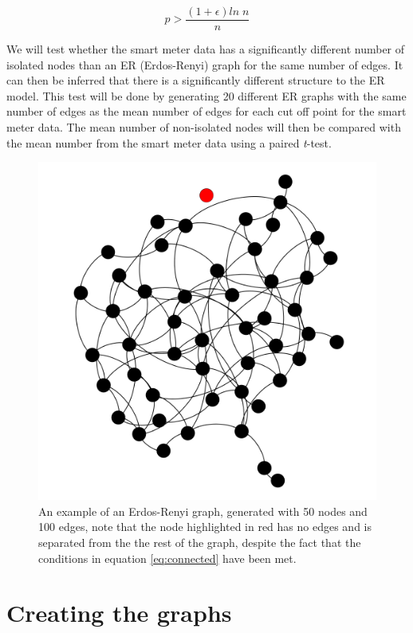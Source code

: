 \begin{equation}
\label{eq:connected}
    p>\frac{(1+\epsilon)ln \; n }{n}
\end{equation}

We will test whether the smart meter data has a significantly different number of isolated nodes than an ER (Erdos-Renyi) graph for the same number of edges. It can then be inferred that there is a significantly different structure to the ER model. This test will be done by generating 20 different ER graphs with the same number of edges as the mean number of edges for each cut off point for the smart meter data. The mean number of non-isolated nodes will then be compared with the mean number from the smart meter data using a paired \textit{t}-test.

\begin{figure}
    \centering
    \includegraphics{Figures/Method/RandomGraph}
    \caption[Example Erdos-Renyi Graph]{An example of an Erdos-Renyi graph, generated with 50 nodes and 100 edges, note that the node highlighted in red has no edges and is separated from the the rest of the graph, despite the fact that the conditions in equation \ref{eq:connected} have been met. }
    \label{fig:RandomGraph}
\end{figure}

\section{Creating the graphs}
\label{chap:creategraph}

